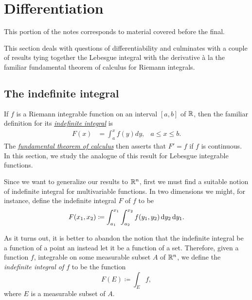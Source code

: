 \section{Differentiation}
This portion of the notes corresponds to material covered before the final.

This section deals with questions of differentiability and culminates with
a couple of results tying together the Lebesgue integral with the
derivative à la the familiar fundamental theorem of calculus for Riemann
integrals.

\subsection{The indefinite integral}
If $f$ is a Riemann integrable function on an interval $[a,b]$ of $\mathbb{R}$,
then the familiar definition for its
\href{https://en.wikipedia.org/wiki/Antiderivative}{\emph{indefinite
    integral}} is
\begin{equation}
\label{eq:3:indefinite-integral}
\begin{aligned}
F(x)&=\int_a^xf(y)dy,&a\leq x\leq b.
\end{aligned}
\end{equation}
The
\href{https://en.wikipedia.org/wiki/Fundamental_theorem_of_calculus}{\emph{fundamental
    theorem of calculus}} then asserts that $F'=f$ if $f$ is continuous. In
this section, we study the analogue of this result for Lebesgue integrable
functions.

Since we want to generalize our results to $\mathbb{R}^n$, first we must find a
suitable notion of indefinite integral for multivariable functions. In two
dimensions we might, for instance, define the indefinite integral $F$ of
$f$ to be
\begin{equation}
\label{eq:3:2-dim-indefinite-integral}
F(x_1,x_2)\coloneqq \int_{a_1}^{x_1}\int_{a_2}^{x_2}f(y_1,y_2)\mathop{}\!\mathrm{d}
y_2\mathop{}\!\mathrm{d} y_1.
\end{equation}

As it turns out, it is better to abandon the notion that the indefinite
integral be a function of a point an instead let it be a function of
a set. Therefore, given a function $f$, integrable on some measurable
subset $A$ of $\mathbb{R}^n$, we define the \emph{indefinite integral of $f$} to
be the function
\begin{equation}
  \label{eq:3:lebesgue-indefinite-integral}
F(E)\coloneqq \int_E f,
\end{equation}
where $E$ is a measurable subset of $A$.

